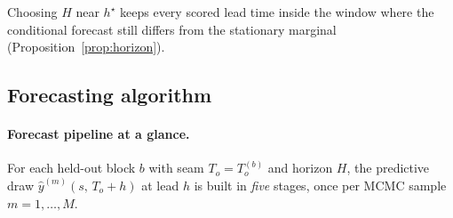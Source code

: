 \documentclass[11pt]{article}
\theoremstyle{definition}
\theoremstyle{remark}
\begin{document}
Choosing $H$ near $h^\star$ keeps every scored lead time inside the
window where the conditional forecast still differs from the stationary
marginal (Proposition~\ref{prop:horizon}).

\subsection{Forecasting algorithm}
\label{sec:forecast-pipeline}

\paragraph{Forecast pipeline at a glance.}
For each held-out block $b$ with seam $T_o = T_o^{(b)}$ and horizon
$H$, the predictive draw $\hat y^{(m)}(s,\,T_o+h)$ at lead $h$ is
built in \emph{five} stages, once per MCMC sample $m=1,\dots,M$.
\end{document}

